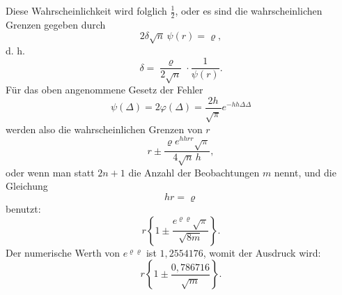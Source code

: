 \documentclass[11pt]{article}
\begin{document}
Diese Wahrscheinlichkeit wird folglich $\frac12$, oder es sind die wahrscheinlichen Grenzen gegeben durch
\[
 2\delta\sqrt n\,\psi(r)=\varrho,
\]
d. h.
\[
 \delta=\frac{\varrho}{2\sqrt n}\cdot\frac1{\psi(r)}.
\]
Für das oben angenommene Gesetz der Fehler
\[
 \psi(\Delta)=2\varphi(\Delta)=\frac{2h}{\sqrt\pi}e^{-hh\Delta\Delta}
\]
werden also die wahrscheinlichen Grenzen von $r$
\[
 r\pm\frac{\varrho e^{hhr r}\sqrt\pi}{4\sqrt n\,h},
\]
oder wenn man statt $2n+1$ die Anzahl der Beobachtungen $m$ nennt, und die Gleichung
\[
 hr=\varrho
\]
benutzt:
\[
 r\left\{1\pm\frac{e^{\varrho\varrho}\sqrt\pi}{\sqrt{8m}}\right\}.
\]
Der numerische Werth von $e^{\varrho\varrho}$ ist $1{,}2554176$, womit der Ausdruck wird:
\[
 r\left\{1\pm\frac{0{,}786716}{\sqrt m}\right\}.
\]
\end{document}
